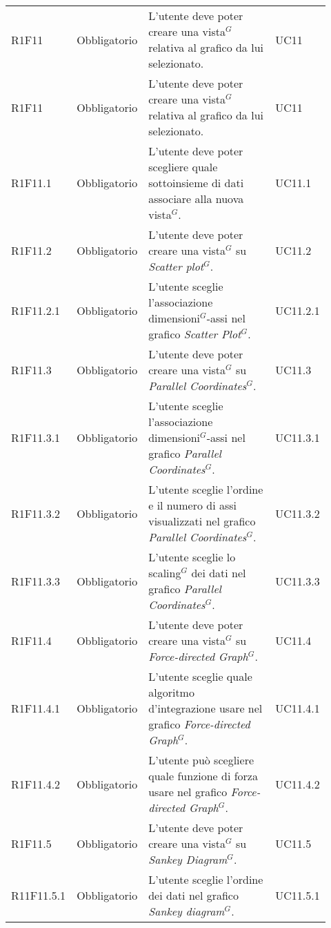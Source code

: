 {\begin{longtable}{p{0.12\linewidth}p{0.15\linewidth}p{0.50\linewidth}p{0.15\linewidth}}
    \rowcolor[RGB]{216, 235, 171}
    R1F11 & Obbligatorio & L'utente deve poter creare una vista$^{G}$ relativa al grafico da lui selezionato. & UC11\\
    \rowcolor[RGB]{233, 245, 206}
    R1F11 & Obbligatorio & L'utente deve poter creare una vista$^{G}$ relativa al grafico da lui selezionato. & UC11\\ 
    \rowcolor[RGB]{216, 235, 171}
    R1F11.1 & Obbligatorio & L'utente deve poter scegliere quale sottoinsieme di dati associare alla nuova vista$^{G}$. & UC11.1\\
    \rowcolor[RGB]{216, 235, 171}
    R1F11.2 & Obbligatorio & L'utente deve poter creare una vista$^{G}$ su \textit{Scatter plot$^{G}$}. & UC11.2\\
    \rowcolor[RGB]{216, 235, 171}
    R1F11.2.1 & Obbligatorio & L'utente sceglie l'associazione dimensioni$^{G}$-assi nel grafico \textit{Scatter Plot$^{G}$}. & UC11.2.1\\
    \rowcolor[RGB]{233, 245, 206}
    R1F11.3 & Obbligatorio & L'utente deve poter creare una vista$^{G}$ su \textit{Parallel Coordinates$^{G}$}. & UC11.3\\
    \rowcolor[RGB]{216, 235, 171}
    R1F11.3.1 & Obbligatorio & L'utente sceglie l'associazione dimensioni$^{G}$-assi nel grafico \textit{Parallel Coordinates$^{G}$}. & UC11.3.1\\
    \rowcolor[RGB]{233, 245, 206}
    R1F11.3.2 & Obbligatorio & L'utente sceglie l'ordine e il numero di assi visualizzati nel grafico \textit{Parallel Coordinates$^{G}$}. &UC11.3.2\\
    \rowcolor[RGB]{216, 235, 171}
    R1F11.3.3 & Obbligatorio & L'utente sceglie lo scaling$^{G}$ dei dati nel grafico \textit{Parallel Coordinates$^{G}$}. & UC11.3.3\\
    \rowcolor[RGB]{233, 245, 206}
    R1F11.4 & Obbligatorio & L'utente deve poter creare una vista$^{G}$ su \textit{Force-directed Graph$^{G}$}. & UC11.4\\
    \rowcolor[RGB]{216, 235, 171}
    R1F11.4.1 & Obbligatorio & L'utente sceglie quale algoritmo d'integrazione usare nel grafico \textit{Force-directed Graph$^{G}$}. & UC11.4.1\\
    \rowcolor[RGB]{233, 245, 206}
    R1F11.4.2 & Obbligatorio & L'utente può scegliere quale funzione di forza usare nel grafico \textit{Force-directed Graph$^{G}$}. & UC11.4.2\\
    \rowcolor[RGB]{216, 235, 171}
    R1F11.5 & Obbligatorio & L'utente deve poter creare una vista$^{G}$ su \textit{Sankey Diagram$^{G}$}. & UC11.5\\
    \rowcolor[RGB]{233, 245, 206}
    R11F11.5.1 & Obbligatorio & L'utente sceglie l'ordine dei dati nel grafico \textit{Sankey diagram$^{G}$}. & UC11.5.1\\


\end{longtable}}
